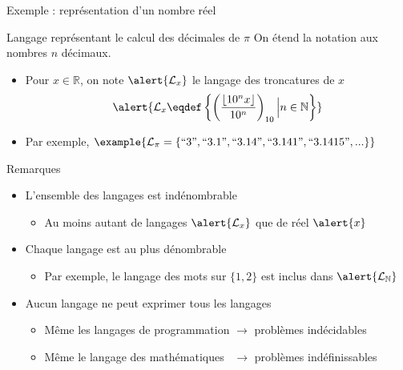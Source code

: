 
\begingroup


\begin{frame}{Exemple : représentation d'un nombre réel}

  \begin{block}{Langage représentant le calcul des décimales de $\pi$}
    On étend la notation  aux nombres $n$ décimaux. 
    \begin{itemize}
    \item Pour $x\in \mathbb{R}$, on note $\alert{\mathcal{L}_{x}}$ le langage des troncatures de $x$
      $$\alert{\mathcal{L}_{x} \eqdef \left\{\left(\frac{\left\lfloor 10^n x \right\rfloor}{10^n} \right)_{10} \Big| n \in \mathbb{N}\right\}}$$
    \item Par exemple, $\example{\mathcal{L}_{\pi} = \left\{\text{``3''}, \text{``3.1''}, \text{``3.14''}, \text{``3.141''}, \text{``3.1415''}, ...   \right\}}$
    \end{itemize}
  \end{block}

  \pause

  \begin{alertblock}{Remarques}
    \begin{itemize}
    \item L'ensemble des langages est indénombrable
      \begin{itemize}
      \item Au moins autant de langages $\alert{\mathcal{L}_{x}}$ que de réel $\alert{x}$
      \end{itemize}
    \item Chaque langage est au plus dénombrable
      \begin{itemize}
      \item Par exemple, le langage des mots sur $\{1, 2\}$ est inclus dans $\alert{\mathcal{L}_{\mathbb{N}}}$
      \end{itemize}
    \item Aucun langage ne peut exprimer tous les langages 
      \begin{itemize}
      \item Même les langages de programmation $\rightarrow$ \alert{problèmes indécidables}
      \item Même le langage des mathématiques ~$\rightarrow$ \alert{problèmes indéfinissables}
      \end{itemize}
    \end{itemize}
  \end{alertblock}

\end{frame}

\endgroup
